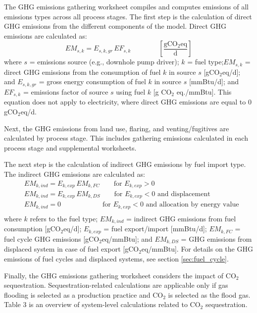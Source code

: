 \documentclass[11pt]{report}
\newcommand{\eqnunitfrac}[2]{\quad\quad \scriptstyle{\left[\frac{\text{#1}}{\text{#2}}\right]}}
\begin{document}
The GHG emissions gathering worksheet compiles and computes emissions of all emissions types across all process stages. The first step is the calculation of direct GHG emissions from the different components of the model. Direct GHG emissions are calculated as: 
\begin{equation}
EM_{s,k} = E_{s,k,gr} \, EF_{s,k} \quad\quad\eqnunitfrac{gCO$_{2}$eq}{d}
\label{direct_emissions}
\end{equation}
where $s$ = emissions source (e.g., downhole pump driver); $k$ = fuel type;\newline $EM_{s,k}$ = direct GHG emissions from the consumption of fuel $k$ in source $s$ [gCO$_{2}$eq/d]; and $E_{s,k,gr}$ = gross energy consumption of fuel $k$ in source $s$ [mmBtu/d]; and $EF_{s,k}$ = emissions factor of source $s$ using fuel $k$ [g CO$_2$ eq./mmBtu]. This equation does not apply to electricity, where direct GHG emissions are equal to 0 gCO$_{2}$eq/d.

Next, the GHG emissions from land use, flaring, and venting/fugitives are calculated by process stage. This includes gathering emissions calculated in each process stage and supplemental worksheets.

The next step is the calculation of indirect GHG emissions by fuel import type. The indirect GHG emissions are calculated as:
\begin{equation}
\begin{split}
& EM_{k,ind} = E_{k,exp} \, EM_{k,FC} \quad\quad \text{for}\,\, E_{k,exp} > 0\\
& EM_{k,ind} = E_{k,exp} \, EM_{k,DS} \quad\quad \text{for}\,\, E_{k,exp} < 0 \,\,\text{and displacement}\\
& EM_{k,ind} = 0 \quad\quad\quad\quad\quad\quad \text{for}\,\, E_{k,exp} < 0 \,\,\text{and allocation by energy value}\\
\end{split}
\end{equation} 
where $k$ refers to the fuel type; $EM_{k,ind}$ = indirect GHG emissions from fuel consumption [gCO$_{2}$eq/d]; $E_{k,exp}$ = fuel export/import [mmBtu/d]; $EM_{k,FC}$ = fuel cycle GHG emissions [gCO$_{2}$eq/mmBtu]; and $EM_{k,DS}$ = GHG emissions from displaced system in case of fuel export [gCO$_{2}$eq/mmBtu]. For details on the GHG emissions of fuel cycles and displaced systems, see section \ref{sec:fuel_cycle}.

Finally, the GHG emissions gathering worksheet considers the impact  of CO$_2$ sequestration. Sequestration-related calculations are applicable only if gas flooding is selected as a production practice and CO$_2$ is selected as the flood gas. Table 3 is an overview of system-level calculations related to CO$_2$ sequestration. 
\end{document}

